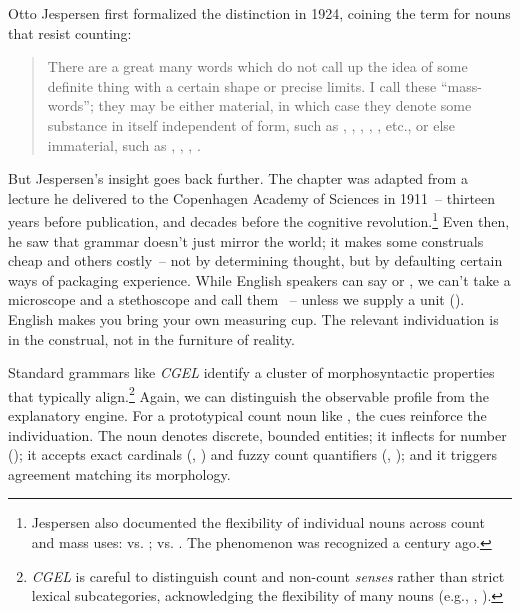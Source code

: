 Otto Jespersen first formalized the distinction in 1924, coining the term  for nouns that resist counting:
\begin{quote}
There are a great many words which do not call up the idea of some definite thing with a certain shape or precise limits. I call these \enquote{mass-words}; they may be either material, in which case they denote some substance in itself independent of form, such as , , , , , etc., or else immaterial, such as , , ,  \citep[198]{jespersen1924}.
\end{quote}
But Jespersen's insight goes back further. The chapter was adapted from a lecture he delivered to the Copenhagen Academy of Sciences in 1911~-- thirteen years before publication, and decades before the cognitive revolution.\footnote{Jespersen also documented the flexibility of individual nouns across count and mass uses:  vs. ;  vs. . The phenomenon was recognized a century ago.} Even then, he saw that grammar doesn't just mirror the world; it makes some construals cheap and others costly~-- not by determining thought, but by defaulting certain ways of packaging experience. While English speakers can say  or , we can't take a microscope and a stethoscope and call them \ungram{}~-- unless we supply a unit (). English makes you bring your own measuring cup. The relevant individuation is in the construal, not in the furniture of reality.

Standard grammars like \textit{CGEL} \citep{huddleston2002} identify a cluster of morphosyntactic properties that typically align.\footnote{\textit{CGEL} is careful to distinguish count and non-count \emph{senses} rather than strict lexical subcategories, acknowledging the flexibility of many nouns (e.g., , ).} Again, we can distinguish the observable profile from the explanatory engine. For a prototypical count noun like , the cues reinforce the individuation. The noun denotes discrete, bounded entities; it inflects for number (); it accepts exact cardinals (, ) and fuzzy count quantifiers (, ); and it triggers agreement matching its morphology.

